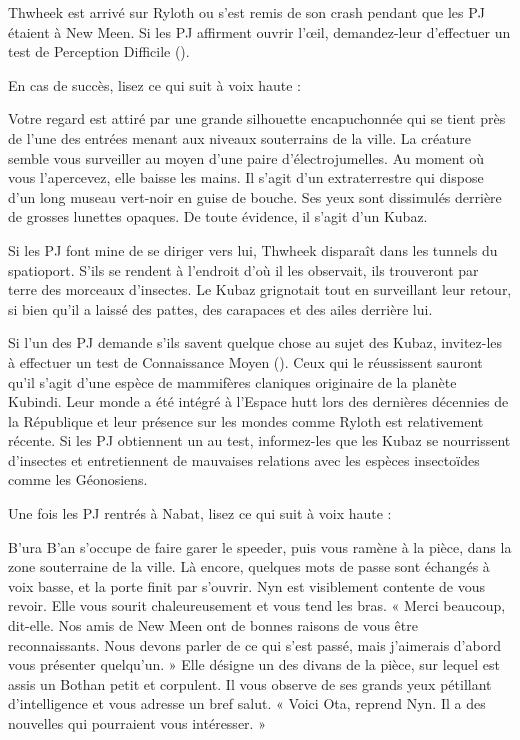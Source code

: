 \documentclass[a4paper,10pt,twoside,twocolumn,openany]{book}
\begin{document}
Thwheek est arrivé sur Ryloth ou s’est remis de son
crash pendant que les PJ étaient à New Meen. Si les
PJ affirment ouvrir l’œil, demandez-leur d’effectuer un
test de Perception Difficile (\difficulty \difficulty \difficulty).


En cas de succès, lisez ce qui suit à voix haute :
\begin{quotebox}
    
Votre regard est attiré par une grande silhouette
encapuchonnée qui se tient près de l’une des entrées menant aux niveaux souterrains de la ville.
La créature semble vous surveiller au moyen d’une
paire d’électrojumelles. Au moment où vous l’apercevez, elle baisse les mains. Il s’agit d’un extraterrestre qui dispose d’un long museau vert-noir en
guise de bouche. Ses yeux sont dissimulés derrière
de grosses lunettes opaques. De toute évidence, il
s’agit d’un Kubaz.\end{quotebox}

Si les PJ font mine de se diriger vers lui, Thwheek disparaît dans les tunnels du spatioport. S’ils se rendent à
l’endroit d’où il les observait, ils trouveront par terre des
morceaux d’insectes. Le Kubaz grignotait tout en surveillant leur retour, si bien qu’il a laissé des pattes, des carapaces et des ailes derrière lui.

Si l’un des PJ demande s’ils savent quelque chose
au sujet des Kubaz, invitez-les à effectuer un test de
Connaissance Moyen (\difficulty \difficulty). Ceux qui le réussissent
sauront qu’il s’agit d’une espèce de mammifères claniques originaire de la planète Kubindi. Leur monde a
été intégré à l’Espace hutt lors des dernières décennies
de la République et leur présence sur les mondes comme
Ryloth est relativement récente. Si les PJ obtiennent
un \advantage au test, informez-les que les Kubaz se nourrissent
d’insectes et entretiennent de mauvaises relations avec
les espèces insectoïdes comme les Géonosiens.

\subtitle{RETROUVAILLES AVEC NYN}

Une fois les PJ rentrés à Nabat, lisez ce qui suit à voix haute :
\begin{quotebox}

B’ura B’an s’occupe de faire garer le speeder, puis
vous ramène à la pièce, dans la zone souterraine
de la ville. Là encore, quelques mots de passe sont
échangés à voix basse, et la porte finit par s’ouvrir.
Nyn est visiblement contente de vous revoir. Elle
vous sourit chaleureusement et vous tend les bras.
« Merci beaucoup, dit-elle. Nos amis de New Meen
ont de bonnes raisons de vous être reconnaissants.
Nous devons parler de ce qui s’est passé, mais j’aimerais d’abord vous présenter quelqu’un. » Elle
désigne un des divans de la pièce, sur lequel est
assis un Bothan petit et corpulent. Il vous observe
de ses grands yeux pétillant d’intelligence et vous
adresse un bref salut. « Voici Ota, reprend Nyn.
Il a des nouvelles qui pourraient vous intéresser. »
\end{quotebox}
\end{document}
